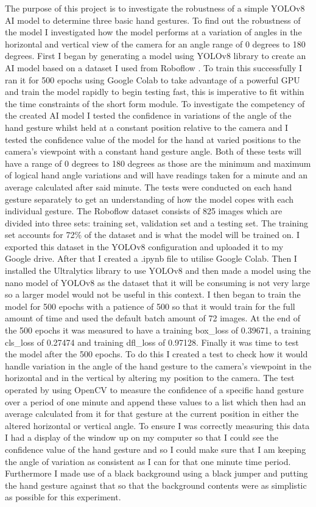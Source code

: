 \documentclass[conference]{IEEEtran}
\begin{document}
The purpose of this project is to investigate the robustness of a simple YOLOv8 AI model to determine three basic hand gestures. To find out the robustness of the model I investigated how the model performs at a variation of angles in the horizontal and vertical view of the camera for an angle range of 0 degrees to 180 degrees.
First I began by generating a model using YOLOv8 library to create an AI model based on a dataset I used from Roboflow \cite{rock-paper-scissors-detection_dataset}. To train this successfully I ran it for 500 epochs using Google Colab to take advantage of a powerful GPU and train the model rapidly to begin testing fast, this is imperative to fit within the time constraints of the short form module.
To investigate the competency of the created AI model I tested the confidence in variations of the angle of the hand gesture whilst held at a constant position relative to the camera and I tested the confidence value of the model for the hand at varied positions to the camera's viewpoint with a constant hand gesture angle.
Both of these tests will have a range of 0 degrees to 180 degrees as those are the minimum and maximum of logical hand angle variations and will have readings taken for a minute and an average calculated after said minute.
The tests were conducted on each hand gesture separately to get an understanding of how the model copes with each individual gesture.
The Roboflow dataset consists of 825 images which are divided into three sets: training set, validation set and a testing set. The training set accounts for 72\% of the dataset and is what the model will be trained on. I exported this dataset in the YOLOv8 configuration and uploaded it to my Google drive.
After that I created a .ipynb file to utilise Google Colab. Then I installed the Ultralytics library to use YOLOv8 and then made a model using the nano model of YOLOv8 as the dataset that it will be consuming is not very large so a larger model would not be useful in this context. I then began to train the model for 500 epochs with a patience of 500 so that it would train for the full amount of time and used the default batch amount of 72 images.   
At the end of the 500 epochs it was measured to have a training box\_loss of 0.39671, a training cls\_loss of 0.27474 and training dfl\_loss of 0.97128.
Finally it was time to test the model after the 500 epochs. To do this I created a test to check how it would handle variation in the angle of the hand gesture to the camera’s viewpoint in the horizontal and in the vertical by altering my position to the camera.
The test operated by using OpenCV to measure the confidence of a specific hand gesture over a period of one minute and append these values to a list which then had an average calculated from it for that gesture at the current position in either the altered horizontal or vertical angle.
To ensure I was correctly measuring this data I had a display of the window up on my computer so that I could see the confidence value of the hand gesture and so I could make sure that I am keeping the angle of variation as consistent as I can for that one minute time period.
Furthermore I made use of a black background using a black jumper and putting the hand gesture against that so that the background contents were as simplistic as possible for this experiment.
\end{document}
